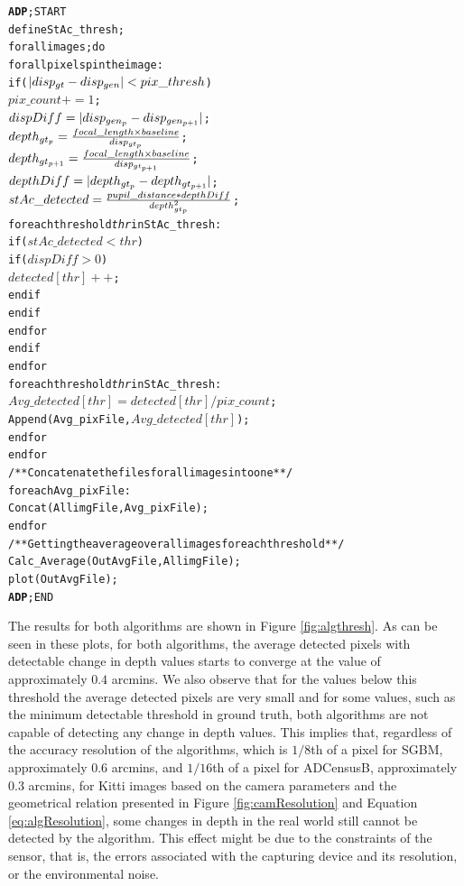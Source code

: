 \begin{alltt}
\textbf{ADP}; START
      define StAc\_thresh;
      for all images; do
         for all pixels p in the image:
            if (\( |disp\sb{gt}-disp\sb{gen}|<pix\_thresh\))
               \(pix\_count += 1\);
               \(dispDiff = |disp\sb{gen\sb{p}}-disp\sb{gen\sb{p+1}}|\);
               \(depth\sb{gt\sb{p}} = \frac{focal\_length \times baseline}{disp\sb{gt\sb{p}}}\);
               \(depth\sb{gt\sb{p+1}} = \frac{focal\_length \times baseline}{disp\sb{gt\sb{p+1}}}\);
               \(depthDiff = |depth\sb{gt\sb{p}}-depth\sb{gt\sb{p+1}}|\);
               \(stAc\_detected = \frac{pupil\_distance*depthDiff}{depth\sb{gt\sb{p}}\sp{2}}\);
               for each threshold \textit{thr} in StAc\_thresh:
                  if (\(stAc\_detected<thr\))
                     if (\(dispDiff>0\))
                        \(detected[thr]++\);
                     end if
                  end if
               end for
            end if
         end for
         for each threshold \textit{thr} in StAc\_thresh:
            \(Avg\_detected[thr] = detected[thr]/pix\_count\);
            Append(Avg\_pixFile, \(Avg\_detected[thr]\));
         end for
      end for
      /**Concatenate the files for all images into one **/
      for each Avg\_pixFile:
         Concat(AllimgFile,Avg\_pixFile);
      end for
      /**Getting the average over all images for each threshold**/
      Calc\_Average(OutAvgFile, AllimgFile);
      plot(OutAvgFile);
\textbf{ADP}; END
\end{alltt}
The results for both algorithms are shown in Figure \ref{fig:algthresh}.
As can be seen in these plots, for both algorithms, the average detected pixels with detectable change in depth values 
starts to converge at the value of approximately $0.4$ arcmins.
We also observe that for the values below this threshold the average detected pixels are very small and for some values, 
such as the minimum detectable threshold in ground truth,
both algorithms are not capable of detecting any change in depth values. 
This implies that, regardless of the accuracy resolution of the algorithms, which is $1/8$th of a pixel for SGBM, approximately $0.6$ arcmins,
and $1/16$th of a pixel for ADCensusB, approximately $0.3$ arcmins, for Kitti images based on the camera parameters and the geometrical 
relation presented in Figure \ref{fig:camResolution} and 
Equation \ref{eq:algResolution}, some changes in 
depth in the real world still cannot be detected by the algorithm. This effect might be due to the constraints of the sensor, that is, the errors associated with the capturing 
device and its resolution, or the environmental noise. 

